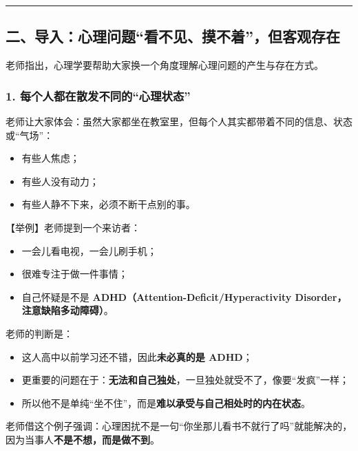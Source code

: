 \documentclass[
  chinese,
  9pt,
  a4paper,
]{ctexart}
\providecommand{\tightlist}{%
  \setlength{\itemsep}{0pt}\setlength{\parskip}{0pt}}
\begin{document}
\begin{center}\rule{0.5\linewidth}{0.5pt}\end{center}

\subsection{二、导入：心理问题``看不见、摸不着''，但客观存在}\label{ux4e8cux5bfcux5165ux5fc3ux7406ux95eeux9898ux770bux4e0dux89c1ux6478ux4e0dux7740ux4f46ux5ba2ux89c2ux5b58ux5728}

老师指出，心理学要帮助大家换一个角度理解心理问题的产生与存在方式。

\subsubsection{1.
每个人都在散发不同的``心理状态''}\label{ux6bcfux4e2aux4ebaux90fdux5728ux6563ux53d1ux4e0dux540cux7684ux5fc3ux7406ux72b6ux6001}

老师让大家体会：虽然大家都坐在教室里，但每个人其实都带着不同的信息、状态或``气场''：

\begin{itemize}
\tightlist
\item
  有些人焦虑；
\item
  有些人没有动力；
\item
  有些人静不下来，必须不断干点别的事。
\end{itemize}

【举例】老师提到一个来访者：

\begin{itemize}
\tightlist
\item
  一会儿看电视，一会儿刷手机；
\item
  很难专注于做一件事情；
\item
  自己怀疑是不是 \textbf{ADHD（Attention-Deficit/Hyperactivity
  Disorder，注意缺陷多动障碍）}。
\end{itemize}

老师的判断是：

\begin{itemize}
\tightlist
\item
  这人高中以前学习还不错，因此\textbf{未必真的是 ADHD}；
\item
  更重要的问题在于：\textbf{无法和自己独处}，一旦独处就受不了，像要``发疯''一样；
\item
  所以他不是单纯``坐不住''，而是\textbf{难以承受与自己相处时的内在状态}。
\end{itemize}

老师借这个例子强调：心理困扰不是一句``你坐那儿看书不就行了吗''就能解决的，因为当事人\textbf{不是不想，而是做不到}。
\end{document}

